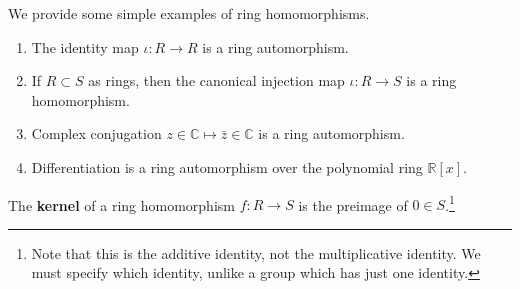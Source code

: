   \begin{example}
    We provide some simple examples of ring homomorphisms. 
    \begin{enumerate}
      \item The identity map $\iota : R \to R$ is a ring automorphism. 
      \item If $R \subset S$ as rings, then the canonical injection map $\iota: R \to S$ is a ring homomorphism. 
      \item Complex conjugation $z \in \mathbb{C} \mapsto \bar{z} \in \mathbb{C}$ is a ring automorphism. 
      \item Differentiation is a ring automorphism over the polynomial ring $\mathbb{R}[x]$. 
    \end{enumerate}
  \end{example} 

  \begin{definition}[Kernel]
    The \textbf{kernel} of a ring homomorphism $f: R \rightarrow S$ is the preimage of $0 \in S$.\footnote{Note that this is the additive identity, not the multiplicative identity. We must specify which identity, unlike a group which has just one identity.}
  \end{definition}

